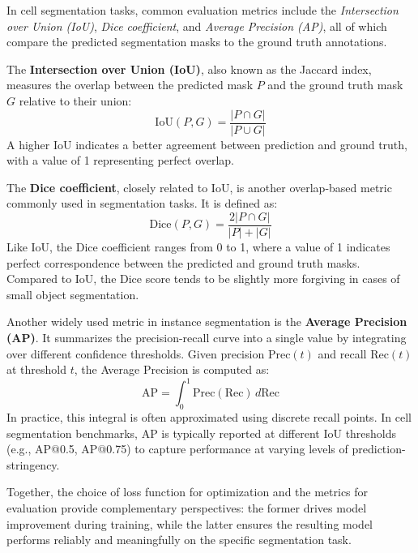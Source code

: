 In cell segmentation tasks, common evaluation metrics include the \textit{Intersection over Union (IoU)}, \textit{Dice coefficient}, and \textit{Average Precision (AP)}, all of which compare the predicted segmentation masks to the ground truth annotations.

The \textbf{Intersection over Union (IoU)}, also known as the Jaccard index, measures the overlap between the predicted mask $P$ and the ground truth mask $G$ relative to their union:
\[
\mathrm{IoU}(P, G) = \frac{|P \cap G|}{|P \cup G|}
\]
A higher IoU indicates a better agreement between prediction and ground truth, with a value of 1 representing perfect overlap.

The \textbf{Dice coefficient}, closely related to IoU, is another overlap-based metric commonly used in segmentation tasks. It is defined as:
\[
\mathrm{Dice}(P, G) = \frac{2 |P \cap G|}{|P| + |G|}
\]
Like IoU, the Dice coefficient ranges from 0 to 1, where a value of 1 indicates perfect correspondence between the predicted and ground truth masks. Compared to IoU, the Dice score tends to be slightly more forgiving in cases of small object segmentation.

Another widely used metric in instance segmentation is the \textbf{Average Precision (AP)}. It summarizes the precision-recall curve into a single value by integrating over different confidence thresholds. Given precision $\mathrm{Prec}(t)$ and recall $\mathrm{Rec}(t)$ at threshold $t$, the Average Precision is computed as:
\[
\mathrm{AP} = \int_0^1 \mathrm{Prec}(\mathrm{Rec}) \, d\mathrm{Rec}
\]
In practice, this integral is often approximated using discrete recall points. In cell segmentation benchmarks, AP is typically reported at different IoU thresholds (e.g., AP@0.5, AP@0.75) to capture performance at varying levels of prediction-stringency.

Together, the choice of loss function for optimization and the metrics for evaluation provide complementary perspectives: the former drives model improvement during training, while the latter ensures the resulting model performs reliably and meaningfully on the specific segmentation task.




